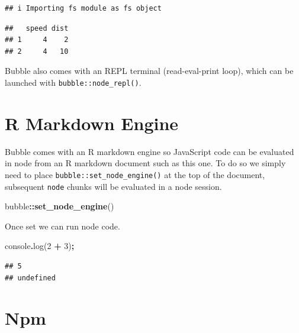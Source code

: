 \documentclass[
]{krantz}
\makeatletter
\newenvironment{Shaded}{\begin{snugshade}}{\end{snugshade}}
\newcommand{\BuiltInTok}[1]{#1}
\newcommand{\DecValTok}[1]{\textcolor[rgb]{0.06,0.06,0.06}{#1}}
\newcommand{\FunctionTok}[1]{\textcolor[rgb]{0,0,0}{#1}}
\newcommand{\KeywordTok}[1]{\textcolor[rgb]{0.27,0.27,0.27}{\textbf{#1}}}
\newcommand{\NormalTok}[1]{#1}
\newcommand{\OperatorTok}[1]{\textcolor[rgb]{0.43,0.43,0.43}{\textbf{#1}}}
\newenvironment{kframe}{%
\medskip{}
\setlength{\fboxsep}{.8em}
 \def\at@end@of@kframe{}%
 \ifinner\ifhmode%
  \def\at@end@of@kframe{\end{minipage}}%
  \begin{minipage}{\columnwidth}%
 \fi\fi%
 \def\FrameCommand##1{\hskip\@totalleftmargin \hskip-\fboxsep
 \colorbox{shadecolor}{##1}\hskip-\fboxsep
     \hskip-\linewidth \hskip-\@totalleftmargin \hskip\columnwidth}%
 \MakeFramed {\advance\hsize-\width
   \@totalleftmargin\z@ \linewidth\hsize
   \@setminipage}}%
 {\par\unskip\endMakeFramed%
 \at@end@of@kframe}
\renewenvironment{Shaded}{\begin{kframe}}{\end{kframe}}
\makeatother
\begin{document}
\begin{verbatim}
## i Importing fs module as fs object
\end{verbatim}

\begin{Shaded}
\end{Shaded}

\begin{verbatim}
##   speed dist
## 1     4    2
## 2     4   10
\end{verbatim}

Bubble also comes with an REPL terminal (read-eval-print loop), which can be launched with \texttt{bubble::node\_repl()}.

\hypertarget{r-markdown-engine}{%
\section*{R Markdown Engine}\label{r-markdown-engine}}


Bubble comes with an R markdown engine so JavaScript code can be evaluated in node from an R markdown document such as this one. To do so we simply need to place \texttt{bubble::set\_node\_engine()} at the top of the document, subsequent \texttt{node} chunks will be evaluated in a node session.

\begin{Shaded}
\begin{Highlighting}[]
\NormalTok{bubble}\OperatorTok{::}\KeywordTok{set\_node\_engine}\NormalTok{()}
\end{Highlighting}
\end{Shaded}

Once set we can run node code.

\begin{Shaded}
\begin{Highlighting}[]
\BuiltInTok{console}\OperatorTok{.}\FunctionTok{log}\NormalTok{(}\DecValTok{2} \OperatorTok{+} \DecValTok{3}\NormalTok{)}\OperatorTok{;}
\end{Highlighting}
\end{Shaded}

\begin{verbatim}
## 5
## undefined
\end{verbatim}

\hypertarget{npm}{%
\section*{Npm}\label{npm}}
\end{document}
